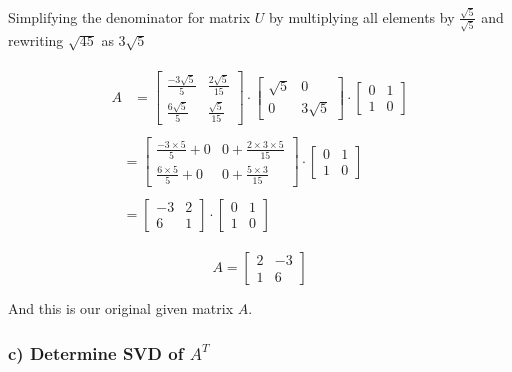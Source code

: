 \documentclass[a4paper]{report}
\begin{document}
Simplifying the denominator for matrix $U$ by multiplying all elements by $\frac{\sqrt{5}}{\sqrt{5}}$ and rewriting $\sqrt{45}$ as $3\sqrt{5}$

\begin{align*}
    \begin{split}
        A &= \begin{bmatrix}
    \frac{-3\sqrt{5}}{5}&\frac{2\sqrt{5}}{15}\\\frac{6\sqrt{5}}{5}&\frac{\sqrt{5}}{15}
\end{bmatrix} \cdot \begin{bmatrix}
    \sqrt{5}&0\\0&3\sqrt{5}
\end{bmatrix}\cdot \begin{bmatrix}
    0&1\\1&0
\end{bmatrix}
    \end{split} \\
    \begin{split}
        &=\begin{bmatrix}
    \frac{-3 \times 5}{5}+0&0+\frac{2\times 3\times 5 }{15}\\\frac{6\times 5}{5}+0&0+\frac{5\times 3}{15}
\end{bmatrix} \cdot \begin{bmatrix}
    0&1\\1&0
\end{bmatrix}
    \end{split} \\
    \begin{split}
        &=\begin{bmatrix}
    -3&2\\6&1
\end{bmatrix} \cdot \begin{bmatrix}
    0&1\\1&0
\end{bmatrix}
    \end{split}
\end{align*}

\begin{equation}
    \boxed{A =\begin{bmatrix}
     2&-3\\1&6 \end{bmatrix}}
\end{equation}

And this is our original given matrix $A$.


\subsubsection*{c) Determine SVD of $A^T$}
\end{document}

